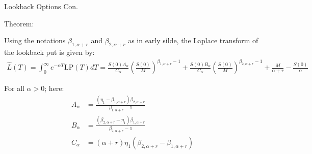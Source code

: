 \documentclass{beamer}
\begin{document}
\begin{frame}{Lookback Options Con.}

    \par Theorem:
    {\footnotesize \footnotesize
    
    \vspace{1em}
    \par Using the notations \(\beta_{1,\alpha+r}\) 
    and \(\beta_{2,\alpha+r}\) as in early silde, the Laplace transform of the lookback put is given by:
    \vspace{1em}
    {\footnotesize \tiny
    \begin{align*}
        \hat{L}(T) = \int_0^\infty e^{-\alpha T} \mathrm{LP}(T)  dT = \frac{S(0)A_\alpha}{C_\alpha} \left( \frac{S(0)}{M} \right)^{\beta_{1,\alpha+r}-1} 
        + \frac{S(0)B_\alpha}{C_\alpha} \left( \frac{S(0)}{M} \right)^{\beta_{2,\alpha+r}-1}  
        + \frac{M}{\alpha+r} - \frac{S(0)}{\alpha}
    \end{align*}
    }
    \vspace{1em}
    \par  \pause  For all \(\alpha > 0\); here:
    \vspace{1em}
    \begin{align*}
        A_\alpha &= \frac{(\eta_1 - \beta_{1,\alpha+r}) \beta_{2,\alpha+r}}{\beta_{1,\alpha+r} - 1} \\
        B_\alpha &= \frac{(\beta_{2,\alpha+r} - \eta_1) \beta_{1,\alpha+r}}{\beta_{2,\alpha+r} - 1}\\
        C_\alpha &= (\alpha + r) \eta_1 (\beta_{2,\alpha+r} - \beta_{1,\alpha+r})
    \end{align*}

    }
    
\end{frame}
\end{document}
